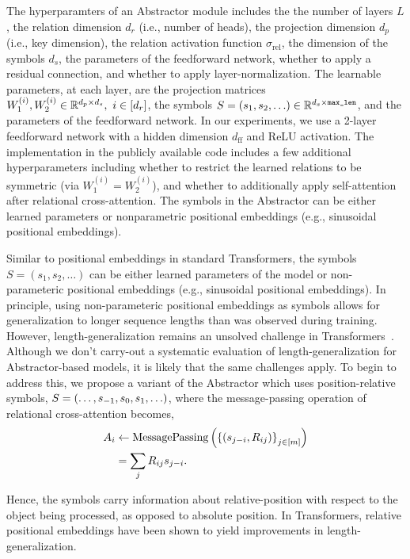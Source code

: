 The hyperparamters of an Abstractor module includes the the number of layers $L$, the relation dimension $d_r$ (i.e., number of heads),  the projection dimension $d_p$ (i.e., key dimension), the relation activation function $\sigma_{\mathrm{rel}}$, the dimension of the symbols $d_s$, the parameters of the feedforward network, whether to apply a residual connection, and whether to apply layer-normalization. The learnable parameters, at each layer, are the projection matrices $W_1^{(i)}, W_2^{(i)} \in \reals^{d_p \times d_s}, \ i \in [d_r]$, the symbols $S = \left(s_1, s_2, \ldots \right) \in \mathbb{R}^{d_s \times \texttt{max\_len}}$, and the parameters of the feedforward network. In our experiments, we use a 2-layer feedforward network with a hidden dimension $d_{\mathrm{ff}}$ and ReLU activation. The implementation in the publicly available code includes a few additional hyperparameters including whether to restrict the learned relations to be symmetric (via $W_1^{(i)} = W_2^{(i)}$), and whether to additionally apply self-attention after relational cross-attention. The symbols in the Abstractor can be either learned parameters or nonparametric positional embeddings (e.g., sinusoidal positional embeddings).

\begin{remark}
    Similar to positional embeddings in standard Transformers, the symbols $S = (s_1, s_2, \ldots)$ can be either learned parameters of the model or non-parameteric positional embeddings (e.g., sinusoidal positional embeddings). In principle, using non-parameteric positional embeddings as symbols allows for generalization to longer sequence lengths than was observed during training. However, length-generalization remains an unsolved challenge in Transformers~\citep{kazemnejadImpactPositionalEncoding2023}. Although we don't carry-out a systematic evaluation of length-generalization for Abstractor-based models, it is likely that the same challenges apply. To begin to address this, we propose a variant of the Abstractor which uses position-relative symbols, $S = \left(\ldots, s_{-1}, s_0, s_1, \ldots\right)$, where the message-passing operation of relational cross-attention becomes,
    \begin{equation}\label{eq:position_relative_symbols}
        \begin{split}
            A_i &\gets \mathrm{MessagePassing}\left(\left\{(s_{j-i}, R_{ij})\right\}_{j \in [m]}\right)\\
            &= \sum_{j} R_{ij} s_{j-i}.
        \end{split}
    \end{equation}

    Hence, the symbols carry information about relative-position with respect to the object being processed, as opposed to absolute position. In Transformers, relative positional embeddings have been shown to yield improvements in length-generalization.
\end{remark}

